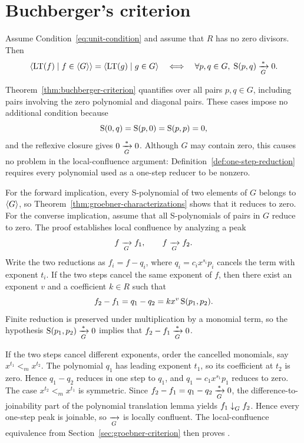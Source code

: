 \section{Buchberger's criterion}\label{sec:buchberger-criterion}

\begin{theorem}
\label{thm:buchberger-criterion}
Assume Condition~\eqref{eq:unit-condition} and assume that $R$ has no zero
divisors.  Then
\[
  \langle \operatorname{LT}(f)\mid f\in\langle G \rangle \rangle
  =\langle \operatorname{LT}(g)\mid g\in G \rangle
  \quad\Longleftrightarrow\quad
  \forall p,q\in G,\;\operatorname{S}(p,q)\xrightarrow[G]{*}0.
\]
\end{theorem}

Theorem~\ref{thm:buchberger-criterion} quantifies over all pairs
$p,q\in G$, including pairs involving the zero polynomial and diagonal
pairs.  These cases impose no additional condition because
\[
  \operatorname{S}(0,q)=\operatorname{S}(p,0)=\operatorname{S}(p,p)=0,
\]
and the reflexive closure gives \(0\xrightarrow[G]{*}0\).  Although $G$ may contain
zero, this causes no problem in the local-confluence argument:
Definition~\ref{def:one-step-reduction} requires every polynomial used as a
one-step reducer to be nonzero.

For the forward implication, every S-polynomial of two elements of $G$
belongs to $\langle G \rangle$, so Theorem~\ref{thm:groebner-characterizations}
shows that it reduces to zero.  For the converse implication, assume that all
S-polynomials of pairs in $G$ reduce to zero.  The proof establishes local
confluence by analyzing a peak
\[
  f\xrightarrow[G]{}f_1,
  \qquad
  f\xrightarrow[G]{}f_2.
\]
Write the two reductions as $f_i=f-q_i$, where
$q_i=c_i x^{s_i} p_i$ cancels the term with exponent $t_i$.  If the two steps
cancel the same exponent of $f$, then there exist an exponent $v$ and a
coefficient $k\in R$ such that
\[
  f_2-f_1=q_1-q_2=kx^v\operatorname{S}(p_1,p_2).
\]
Finite reduction is preserved under multiplication by a monomial term, so the
hypothesis $\operatorname{S}(p_1,p_2)\xrightarrow[G]{*}0$ implies that
$f_2-f_1\xrightarrow[G]{*}0$.

If the two steps cancel different exponents, order the cancelled monomials,
say $x^{t_1}<_m x^{t_2}$.  The polynomial $q_1$ has leading exponent $t_1$,
so its coefficient at $t_2$ is zero.  Hence $q_1-q_2$ reduces in one step to
$q_1$, and $q_1=c_1x^{s_1} p_1$ reduces to zero.  The case
$x^{t_2}<_m x^{t_1}$ is symmetric.  Since
$f_2-f_1=q_1-q_2\xrightarrow[G]{*}0$, the difference-to-joinability part of the
polynomial translation lemma yields $f_1\mathrel{\downarrow}_{G}f_2$.  Hence every one-step
peak is joinable, so $\xrightarrow[G]{}$ is locally confluent.  The local-confluence equivalence from
Section~\ref{sec:groebner-criterion} then proves
.

